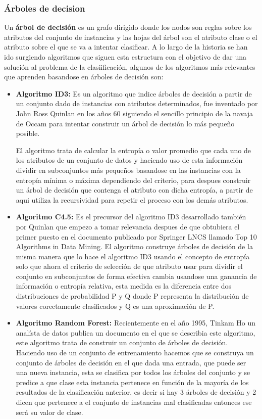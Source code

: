 \documentclass[a4paper, 11pt]{article} %
\begin{document}
\subsubsection{Árboles de decision}
Un \textbf{árbol de decisión} es un grafo dirigido donde los nodos son reglas sobre los atributos del conjunto de instancias y las hojas del árbol son el atributo clase o el atributo sobre el que se va a intentar clasificar. A lo largo de la historia se han ido surgiendo algoritmos que siguen esta estructura con el objetivo de dar una solución al problema de la clasiificación, algunos de los algoritmos más relevantes que aprenden basandose en árboles de decisión son:
\begin{itemize}
\item \textbf{Algoritmo ID3:} Es un algoritmo que indice árboles de decisión a partir de un conjunto dado de instancias con atributos determinados, fue inventado por John Ross Quinlan en los años 60 siguiendo el sencillo principio de la navaja de Occam para intentar construir un árbol de decisión lo más pequeño posible.

El algoritmo trata de calcular la entropía o valor promedio que cada uno de los atributos de un conjunto de datos y haciendo uso de esta información dividir en subconjuntos más pequeños basandose en las instancias con la entropía mínima o máxima dependiendo del criterio, para despues construir un árbol de decisión que contenga el atributo con dicha entropía, a partir de aqui utiliza la recursividad para repetir el proceso con los demás atributos.
\item \textbf{Algoritmo C4.5:} Es el precursor del algoritmo ID3 desarrollado también por Quinlan que empezo a tomar relevancia despues de que obtubiera el primer puesto  en el documento publicado por Springer LNCS llamado Top 10 Algorithms in Data Mining.
El algoritmo construye árboles de decisión de la misma manera que lo hace el algoritmo ID3 usando el concepto de entropía solo que ahora el criterio de selección de que atributo usar para dividir el conjunto en subconjuntos de forma efectiva cambia usandose una ganancia de información o entropía relativa, esta medida es la diferencia entre dos distribuciones de probabilidad P y Q donde P representa la distribución de valores corectamente clasificados y Q  es una aproximación de P.
\item \textbf{Algoritmo Random Forest:} Recientemente en el año 1995, Tinkam Ho un analísta de datos publica un documento en el que se describia este algoritmo, este algoritmo trata de construir un conjunto de árboles de decisión. Haciendo uso de un conjunto de entrenamiento hacemos que se construya un conjunto de árboles de decisión en el que 
dada una entrada, que puede ser una nueva instancia, esta se clasifica por todos los árboles del conjunto y se predice a que clase esta instancia pertenece en función de la mayoría de los resultados de la clasificación anterior, es decir si hay 3 árboles de decisión y 2 dicen que pertenece a el conjunto de instancias mal clasificadas entonces ese será su valor de clase.
\end{itemize}
\end{document}
